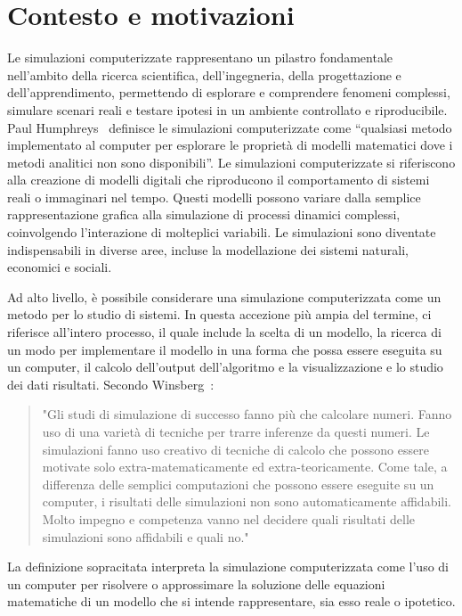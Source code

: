 \documentclass[12pt,a4paper,openright,twoside]{book}
\begin{document}
\section{Contesto e motivazioni}
Le simulazioni computerizzate rappresentano un pilastro fondamentale nell'ambito della ricerca scientifica, dell'ingegneria, della progettazione e dell'apprendimento, permettendo di esplorare e comprendere fenomeni complessi, simulare scenari reali e testare ipotesi in un ambiente controllato e riproducibile. 
Paul Humphreys~\cite{Humphreys1990-HUMCS} definisce le simulazioni computerizzate come ``qualsiasi metodo implementato al computer per esplorare le proprietà di modelli matematici dove i metodi analitici non sono disponibili''. 
Le simulazioni computerizzate si riferiscono alla creazione di modelli digitali che riproducono il comportamento di sistemi reali o immaginari nel tempo. Questi modelli possono variare dalla semplice rappresentazione grafica alla simulazione di processi dinamici complessi, coinvolgendo l'interazione di molteplici variabili. 
Le simulazioni sono diventate indispensabili in diverse aree, incluse la modellazione dei sistemi naturali, economici e sociali. 

Ad alto livello, è possibile considerare una simulazione computerizzata come un metodo per lo studio di sistemi. In questa accezione più ampia del termine, ci riferisce all'intero processo, il quale include la scelta di un modello, la ricerca di un modo per implementare il modello in una forma che possa essere eseguita su un computer, il calcolo dell'output dell'algoritmo e la visualizzazione e lo studio dei dati risultati. Secondo Winsberg~\cite{Winsberg_2003}: 
\begin{quotation}
    "Gli studi di simulazione di successo fanno più che calcolare numeri. Fanno uso di una varietà di tecniche per trarre inferenze da questi numeri. Le simulazioni fanno uso creativo di tecniche di calcolo che possono essere motivate solo extra-matematicamente ed extra-teoricamente. Come tale, a differenza delle semplici computazioni che possono essere eseguite su un computer, i risultati delle simulazioni non sono automaticamente affidabili. Molto impegno e competenza vanno nel decidere quali risultati delle simulazioni sono affidabili e quali no." 
\end{quotation}
La definizione sopracitata interpreta la simulazione computerizzata come l'uso di un computer per risolvere o approssimare la soluzione delle equazioni matematiche di un modello che si intende rappresentare, sia esso reale o ipotetico. 
\end{document}
